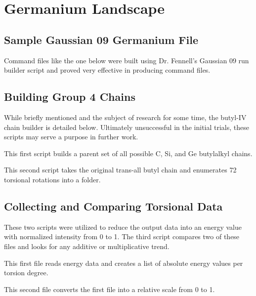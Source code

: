 \chapter{Germanium Landscape}
\label{ch:App:Germane}

\section{Sample Gaussian 09 Germanium File}
\label{SampleGeRunFile}
Command files like the one below were built using Dr. Fennell's Gaussian 09 run builder script and proved very effective in producing command files.


\section{Building Group 4 Chains}

While briefly mentioned and the subject of research for some time, the butyl-IV chain builder is detailed below. 
Ultimately unsuccessful in the initial trials, these scripts may serve a purpose in further work.

This first script builds a parent set of all possible C, Si, and Ge butylalkyl chains.



This second script takes the original trans-all butyl chain and enumerates 72 torsional rotations into a folder.



\section{Collecting and Comparing Torsional Data}

These two scripts were utilized to reduce the output data into an energy value with normalized intensity from 0 to 1. The third script compares two of these files and looks for any additive or multiplicative trend.

This first file reads energy data and creates a list of absolute energy values per torsion degree.


This second file converts the first file into a relative scale from 0 to 1.



